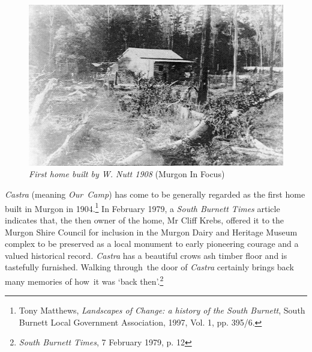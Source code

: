 \begin{figure}
\begin{center}
\includegraphics[width=1.\linewidth,center]{../images/HouseWNutt1908.jpg}
\caption{{\itshape First home built by W. Nutt 1908} {\scriptsize(Murgon In Focus)}}
\end{center}
\end{figure}




\emph{Castra} (meaning \emph{Our~Camp}) has come to be generally regarded as the first home built in Murgon in 1904.\footnote{Tony Matthews, \emph{Landscapes of Change: a history of the South Burnett}, South Burnett Local Government Association, 1997, Vol. 1, pp. 395/6.} In February 1979, a \emph{South Burnett Times} article indicates that, the then owner of the home, Mr Cliff Krebs, offered it to the Murgon Shire Council for inclusion in the Murgon Dairy and Heritage Museum complex to be preserved as a local monument to early pioneering courage and a valued historical record\emph{. Castra} has a beautiful crows ash timber floor and is tastefully furnished. Walking through~the door of \emph{Castra} certainly brings back many memories of how~it was `back then'.\footnote{\emph{South Burnett Times}, 7 February 1979, p. 12}








